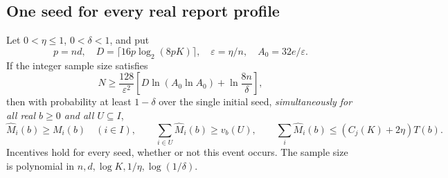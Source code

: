 \subsection{One seed for every real report profile}
\begin{theorem}\label{alg:uniform}
Let $0<\eta\le1$, $0<\delta<1$, and put
\[
 p=nd,\quad D=\lceil16p\log_2(8pK)\rceil,\quad
 \varepsilon=\eta/n,\quad A_0=32e/\varepsilon.
\]
If the integer sample size satisfies
\begin{equation}\label{alg:sample-size}
 N\ge\frac{128}{\varepsilon^2}
       \left[D\ln(A_0\ln A_0)+\ln\frac{8n}{\delta}\right],
\end{equation}
then with probability at least $1-\delta$ over the single initial seed,
\emph{simultaneously for all real $b\ge0$ and all $U\subseteq I$},
\[
 \widehat M_i(b)\ge M_i(b)\quad(i\in I),\qquad
 \sum_{i\in U}\widehat M_i(b)\ge v_b(U),\qquad
 \sum_i\widehat M_i(b)\le(C_j(K)+2\eta)T(b).
\]
Incentives hold for every seed, whether or not this event occurs.
The sample size is polynomial in $n,d,\log K,1/\eta,\log(1/\delta)$.
\end{theorem}
